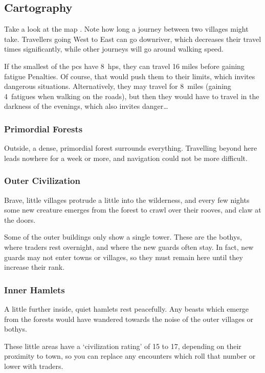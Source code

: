 \begin{multicols}{2}

\subsection{Cartography}

Take a look at the map .
Note how long a journey between two \glspl{village} might take.
Travellers going West to East can go downriver, which decreases their travel times significantly, while other journeys will go around walking speed.

If the smallest of the \glspl{pc} have 8~\glspl{hp}, they can travel 16 miles before gaining \gls{fatigue} Penalties.
Of course, that would push them to their limits, which invites dangerous situations.
Alternatively, they may travel for 8~miles (gaining 4~\glspl{fatigue} when walking on the roads), but then they would have to travel in the darkness of the evenings, which also invites danger\ldots

\subsubsection{Primordial Forests}
Outside, a dense, primordial forest surrounds everything.
Travelling beyond here leads nowhere for a week or more, and navigation could not be more difficult.

\subsubsection{Outer Civilization}
Brave, little \glspl{village} protrude a little into the wilderness, and every few nights some new creature emerges from the forest to crawl over their rooves, and claw at the doors.

Some of the outer buildings only show a single tower.
These are the \glspl{bothy}, where traders rest overnight, and where the new \glspl{guard} often stay.
In fact, new \glspl{guard} may not enter towns or \glspl{village}, so they must remain here until they increase their rank.%

\subsubsection{Inner Hamlets}
A little further inside, quiet hamlets rest peacefully.
Any beasts which emerge from the forests would have wandered towards the noise of the outer \glspl{village} or \glspl{bothy}.

These little areas have a `civilization rating' of 15 to 17, depending on their proximity to town, so you can replace any encounters which roll that number or lower with traders.%

\end{multicols}

